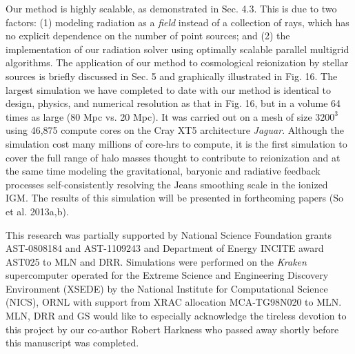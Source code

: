 Our method is highly scalable, as demonstrated in Sec. 4.3. This is due to two factors: (1) 
modeling radiation as a {\em field} instead of a collection of rays, which has no explicit dependence on the number
of point sources; and (2) the implementation of our radiation solver using optimally scalable parallel multigrid algorithms.
The application of our method to cosmological reionization by stellar sources is briefly discussed in Sec. 5 and 
graphically illustrated in Fig. 16.  The largest simulation we have completed to date with our method is identical to 
design, physics, and numerical resolution as that in Fig. 16, but in a volume 64 times as large (80 Mpc vs. 20 Mpc).
It was carried out on a 
mesh of size $3200^3$ using 46,875 compute cores on the Cray XT5 architecture {\em Jaguar}. 
Although the simulation cost many millions of core-hrs to compute, it is
the first simulation to cover the full range of halo masses thought to contribute to reionization and at the same time
modeling the gravitational, baryonic and radiative feedback processes self-consistently resolving the Jeans smoothing scale
in the ionized IGM. The results of this simulation will be presented in forthcoming papers (So et al. 2013a,b). 

This research was partially supported by National Science Foundation grants AST-0808184 and AST-1109243
and Department of Energy INCITE award AST025 to MLN and DRR. Simulations were performed on the {\em Kraken}
supercomputer operated for the Extreme Science and Engineering Discovery Environment (XSEDE)
by the National Institute for Computational Science (NICS), ORNL with support from XRAC allocation MCA-TG98N020 to MLN.
MLN, DRR and GS would like to especially acknowledge the tireless devotion to this project by our co-author Robert Harkness
who passed away shortly before this manuscript was completed. 


